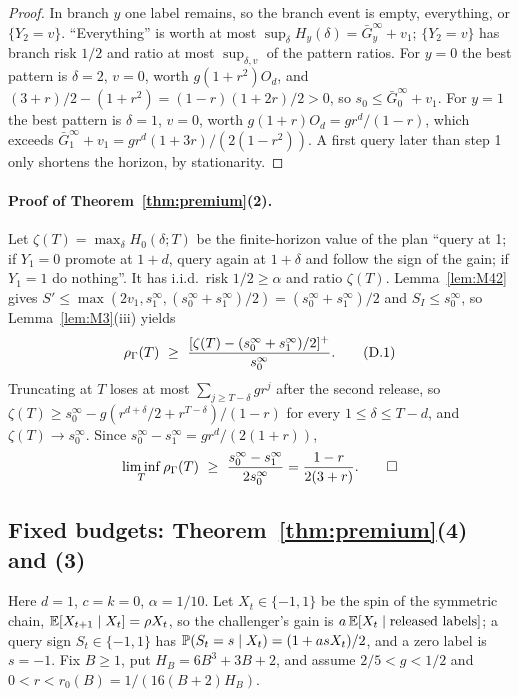 \begin{proof}
In branch $y$ one label remains, so the branch event is empty, everything, or $\{Y_2=v\}$. ``Everything'' is worth at most $\sup_\delta H_y(\delta)=\bar G_y^\infty+v_1$; $\{Y_2=v\}$ has branch risk $1/2$ and ratio at most $\sup_{\delta,v}$ of the pattern ratios. For $y=0$ the best pattern is $\delta=2$, $v=0$, worth $g(1+r^2)O_d$, and $(3+r)/2-(1+r^2)=(1-r)(1+2r)/2>0$, so $s_0\le\bar G_0^\infty+v_1$. For $y=1$ the best pattern is $\delta=1$, $v=0$, worth $g(1+r)O_d=gr^d/(1-r)$, which exceeds $\bar G_1^\infty+v_1=gr^d(1+3r)/(2(1-r^2))$. A first query later than step 1 only shortens the horizon, by stationarity.
\end{proof}

\paragraph{Proof of Theorem~\ref{thm:premium}(2).} Let $\zeta(T)=\max_\delta H_0(\delta;T)$ be the finite-horizon value of the plan ``query at 1; if $Y_1=0$ promote at $1+d$, query again at $1+\delta$ and follow the sign of the gain; if $Y_1=1$ do nothing''. It has i.i.d.\ risk $1/2\ge\alpha$ and ratio $\zeta(T)$. Lemma~\ref{lem:M42} gives $S'\le\max(2v_1,s_1^\infty,(s_0^\infty+s_1^\infty)/2)=(s_0^\infty+s_1^\infty)/2$ and $S_I\le s_0^\infty$, so Lemma~\ref{lem:M3}(iii) yields
\[
\rhoG(T)\ \ge\ \frac{[\zeta(T)-(s_0^\infty+s_1^\infty)/2]^+}{s_0^\infty}.
\tag{D.1}
\]
Truncating at $T$ loses at most $\sum_{j\ge T-\delta}gr^j$ after the second release, so $\zeta(T)\ge s_0^\infty-g(r^{d+\delta}/2+r^{T-\delta})/(1-r)$ for every $1\le\delta\le T-d$, and $\zeta(T)\to s_0^\infty$. Since $s_0^\infty-s_1^\infty=gr^d/(2(1+r))$,
\[
\liminf_T\rhoG(T)\ \ge\ \frac{s_0^\infty-s_1^\infty}{2s_0^\infty}=\frac{1-r}{2(3+r)}.\qquad\square
\]

\subsection{Fixed budgets: Theorem~\ref{thm:premium}(4) and (3)}

Here $d=1$, $c=k=0$, $\alpha=1/10$. Let $X_t\in\{-1,1\}$ be the spin of the symmetric chain, $\mathbb{E}[X_{t+1}\mid X_t]=\rho X_t$, so the challenger's gain is $a\,\mathbb{E}[X_t\mid\text{released labels}]$; a query sign $S_t\in\{-1,1\}$ has $\mathbb{P}(S_t=s\mid X_t)=(1+asX_t)/2$, and a zero label is $s=-1$. Fix $B\ge1$, put $H_B=6B^3+3B+2$, and assume $2/5<g<1/2$ and $0<r<r_0(B)=1/(16(B+2)H_B)$.

